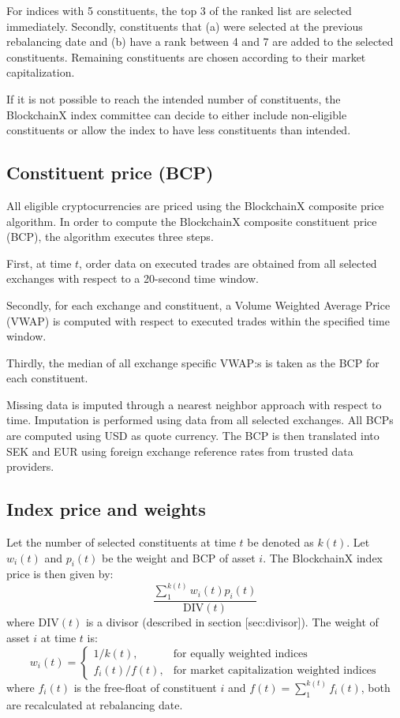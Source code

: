 \documentclass{article}
\begin{document}
For indices with 5 constituents, the top 3 of the ranked list are
selected immediately. Secondly, constituents that (a) were selected at
the previous rebalancing date and (b) have a rank between 4 and 7 are
added to the selected constituents. Remaining constituents are chosen
according to their market capitalization.

If it is not possible to reach the intended number of constituents, the
BlockchainX index committee can decide to either include non-eligible
constituents or allow the index to have less constituents than intended.

\subsection{Constituent price (BCP)}\label{sec:BCP}

All eligible cryptocurrencies are priced using the BlockchainX composite
price algorithm. In order to compute the BlockchainX composite
constituent price (BCP), the algorithm executes three steps.

First, at time \(t\), order data on executed trades are obtained from
all selected exchanges with respect to a 20-second time window.

Secondly, for each exchange and constituent, a Volume Weighted Average
Price (VWAP) is computed with respect to executed trades within the
specified time window.

Thirdly, the median of all exchange specific VWAP:s is taken as the BCP
for each constituent.

Missing data is imputed through a nearest neighbor approach with respect
to time. Imputation is performed using data from all selected exchanges.
All BCPs are computed using USD as quote currency. The BCP is then
translated into SEK and EUR using foreign exchange reference rates from
trusted data providers.

\subsection{Index price and weights}\label{index-price-and-weights}

Let the number of selected constituents at time \(t\) be denoted as
\(k(t)\). Let \(w_i(t)\) and \(p_i(t)\) be the weight and BCP of asset
\(i\). The BlockchainX index price is then given by: \[%
  \frac{  \sum_{1}^{k(t)} w_i(t) p_{i}(t)  }{\text{DIV}(t)}
\label{eq:index}\] where \(\text{DIV}(t)\) is a divisor (described in
section {[}sec:divisor{]}). The weight of asset \(i\) at time \(t\) is:
\[w_i(t)=
\begin{cases}
    1 / k(t), & \text{for equally weighted indices} \\
    f_{i}(t) /f(t),  & \text{for market capitalization weighted indices}
\end{cases}\] where \(f_{i}(t)\) is the free-float of constituent \(i\)
and \(f(t)=\sum_1^{k(t)}f_i(t)\), both are recalculated at rebalancing
date.
\end{document}

